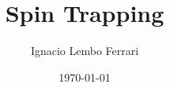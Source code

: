 \documentclass[aps,prl,reprint,superscriptaddress,showkeys]{revtex4-2}
\begin{document}

\title{Spin Trapping}


\author{Ignacio Lembo Ferrari}



\date{\today}

\begin{abstract}


\end{abstract}


\maketitle

\end{document}
